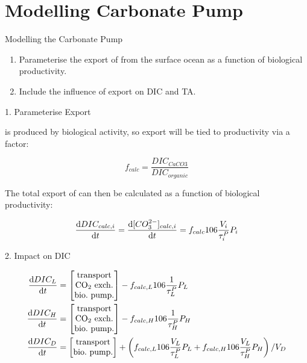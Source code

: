 \section{Modelling Carbonate Pump}

\begin{frame}{Modelling the Carbonate Pump}

    \begin{enumerate}
        \item Parameterise the export of \ce{[CO3^{2-}]} from the surface ocean as a function of biological productivity.
        \item Include the influence of \ce{[CO3^{2-}]} export on DIC and TA.
    \end{enumerate}

\end{frame}


\begin{frame}{1. Parameterise  Export}

     is produced by biological activity, so export will be tied to productivity via a factor:

    $$
    f_{calc} = \frac{DIC_{CaCO3}}{DIC_{organic}}
    $$

    The total export of \ce{[CO3^{2-}]} can then be calculated as a function of biological productivity:

    $$
    \dv{DIC_{calc, i}}{t} = \dv{\ce[CO_3^{2-}]_{calc, i}}{t} = f_{calc} 106 \frac{V_i}{\tau^P_i} P_i
    $$

\end{frame}

\begin{frame}{2. Impact on DIC}

    \begin{align*}
        \frac{\mathrm{d}DIC_L}{\mathrm{d}t} &= \begin{bmatrix} \mathrm{transport} \\ \mathrm{CO_2~exch.} \\ \mathrm{bio.~pump.} \end{bmatrix} - f_{calc,L} 106 \frac{1}{\tau^P_L} P_L \\
        \frac{\mathrm{d}DIC_H}{\mathrm{d}t} &= \begin{bmatrix} \mathrm{transport} \\ \mathrm{CO_2~exch.} \\ \mathrm{bio.~pump.} \end{bmatrix} - f_{calc,H} 106 \frac{1}{\tau^P_H} P_H \\
        \frac{\mathrm{d}DIC_D}{\mathrm{d}t} &= \begin{bmatrix} \mathrm{transport} \\ \mathrm{bio.~pump.} \end{bmatrix} + \left(f_{calc,L} 106 \frac{V_L}{\tau^P_L} P_L + f_{calc,H} 106 \frac{V_L}{\tau^P_H} P_H \right) / V_D
    \end{align*}

\end{frame}

